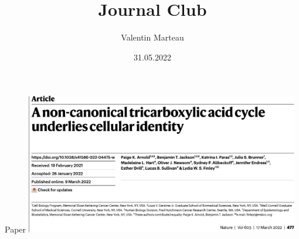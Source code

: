 \documentclass[10pt, aspectratio=169]{beamer}
\title{Journal Club}
\author{Valentin Marteau}
\date{31.05.2022}
\begin{document}
{
  \begin{frame}
    \titlepage
  \end{frame}
}

\begin{frame}{Paper}
\centering
\includegraphics[width=0.9\textwidth]{figures/Arnold_2022_title.pdf}
\end{frame}
\end{document}
